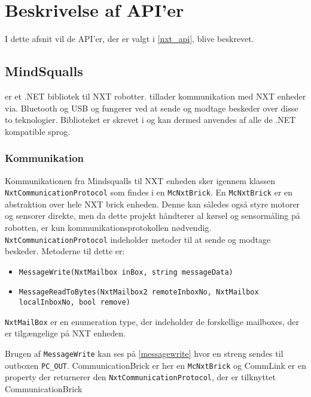 
\section{Beskrivelse af API'er}

I dette afsnit vil de API'er, der er valgt i \cref{nxt_api}, blive beskrevet.

\subsection{MindSqualls}\label{mindsqualls}
\mindsqualls er et .NET bibliotek til \legos NXT robotter.
\mindsqualls tillader kommunikation med NXT enheder via. Bluetooth og USB og fungerer ved at sende og modtage beskeder over disse to teknologier.
Biblioteket er skrevet i \csharp og kan dermed anvendes af alle de .NET kompatible sprog.

\subsubsection{Kommunikation}
Kommunikationen fra Mindsqualls til NXT enheden sker igennem klassen \lstinline[style=csharp]!NxtCommunicationProtocol! som findes i en \lstinline[style=csharp]!McNxtBrick!. 
En \lstinline[style=csharp]!McNxtBrick! er en abstraktion over hele NXT brick enheden. 
Denne kan således også styre motorer og sensorer direkte, men da dette projekt håndterer al kørsel og sensormåling på robotten, er kun kommunikationsprotokollen nødvendig.
\lstinline[style=csharp]!NxtCommunicationProtocol! indeholder metoder til at sende og modtage beskeder.
Metoderne til dette er:

\begin{itemize}
\item \lstinline[style=csharp]!MessageWrite(NxtMailbox inBox, string messageData)!
\item \lstinline[style=csharp]!MessageReadToBytes(NxtMailbox2 remoteInboxNo, NxtMailbox localInboxNo, bool remove)!
\end{itemize}

\lstinline[style=csharp]!NxtMailBox! er en enumeration type, der indeholder de forskellige mailboxes, der er tilgængelige på NXT enheden.

Brugen af \lstinline[style=csharp]!MessageWrite! kan ses på \cref{messagewrite} hvor en streng sendes til outboxen \lstinline[style=csharp]!PC_OUT!.
CommunicationBrick er her en \lstinline[style=csharp]!McNxtBrick! og CommLink er en property der returnerer den \lstinline[style=csharp]!NxtCommunicationProtocol!, der er tilknyttet CommunicationBrick 

